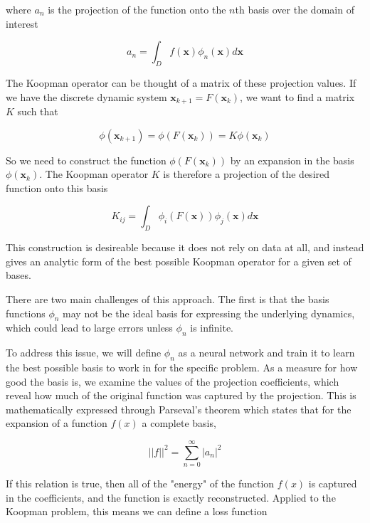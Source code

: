\documentclass[12pt, letterpaper]{article}
\begin{document}
where $a_n$ is the projection of the function onto the $n$th basis over the domain of interest

\begin{equation}
    a_n = \int_D f(\mathbf{x}) \phi_n(\mathbf{x})  d \mathbf{x}
\end{equation}

The Koopman operator can be thought of a matrix of these projection values.  If we have the discrete dynamic system $\mathbf{x}_{k+1} = F(\mathbf{x}_k)$, we want to find a matrix $K$ such that 

\begin{equation}
    \phi(\mathbf{x}_{k+1}) = \phi(F(\mathbf{x}_k)) = K \phi(\mathbf{x}_k)
\end{equation}

So we need to construct the function $\phi(F(\mathbf{x}_k))$ by an expansion in the basis $\phi(\mathbf{x}_k)$.  The Koopman operator $K$ is therefore a projection of the desired function onto this basis

\begin{equation}
    \label{eq:koopman_projection}
    K_{ij} = \int_D \phi_i(F(\mathbf{x})) \phi_j(\mathbf{x})  d \mathbf{x}
\end{equation}

This construction is desireable because it does not rely on data at all, and instead gives an analytic form of the best possible Koopman operator for a given set of bases.  

There are two main challenges of this approach.  The first is that the basis functions $\phi_n$ may not be the ideal basis for expressing the underlying dynamics, which could lead to large errors unless $\phi_n$ is infinite.  

To address this issue, we will define $\phi_n$ as a neural network and train it to learn the best possible basis to work in for the specific problem.  As a measure for how good the basis is, we examine the values of the projection coefficients, which reveal how much of the original function was captured by the projection.  This is mathematically expressed through Parseval's theorem which states that for the expansion of a function $f(x)$ a complete basis,

\begin{equation}
    ||f||^2 = \overset{\infty}{\underset{n = 0}{\sum}} |a_n|^2
\end{equation}

If this relation is true, then all of the "energy" of the function $f(x)$ is captured in the coefficients, and the function is exactly reconstructed.  Applied to the Koopman problem, this means we can define a loss function
\end{document}
